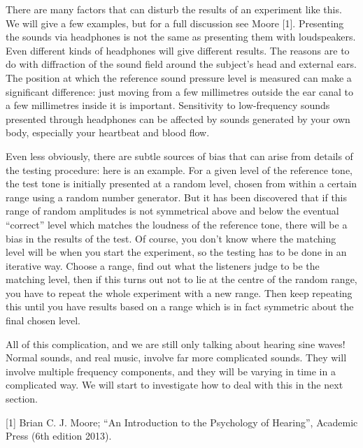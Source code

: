   There are many factors that can disturb the results of an experiment like 
  this. We will give a few examples, but for a full discussion see Moore [1]. 
  Presenting the sounds via headphones is not the same as presenting them with 
  loudspeakers. Even different kinds of headphones will give different results. 
  The reasons are to do with diffraction of the sound field around the 
  subject's head and external ears. The position at which the reference sound 
  pressure level is measured can make a significant difference: just moving 
  from a few millimetres outside the ear canal to a few millimetres inside it 
  is important. Sensitivity to low-frequency sounds presented through 
  headphones can be affected by sounds generated by your own body, especially 
  your heartbeat and blood flow. 

  Even less obviously, there are subtle sources of bias that can arise from 
  details of the testing procedure: here is an example. For a given level of 
  the reference tone, the test tone is initially presented at a random level, 
  chosen from within a certain range using a random number generator. But it 
  has been discovered that if this range of random amplitudes is not 
  symmetrical above and below the eventual ``correct'' level which matches the 
  loudness of the reference tone, there will be a bias in the results of the 
  test. Of course, you don't know where the matching level will be when you 
  start the experiment, so the testing has to be done in an iterative way. 
  Choose a range, find out what the listeners judge to be the matching level, 
  then if this turns out not to lie at the centre of the random range, you have 
  to repeat the whole experiment with a new range. Then keep repeating this 
  until you have results based on a range which is in fact symmetric about the 
  final chosen level. 

  All of this complication, and we are still only talking about hearing sine 
  waves! Normal sounds, and real music, involve far more complicated sounds. 
  They will involve multiple frequency components, and they will be varying in 
  time in a complicated way. We will start to investigate how to deal with this 
  in the next section. 



  \sectionreferences{}[1] Brian C. J. Moore; ``An Introduction to the 
  Psychology of Hearing'', Academic Press (6th edition 2013). 